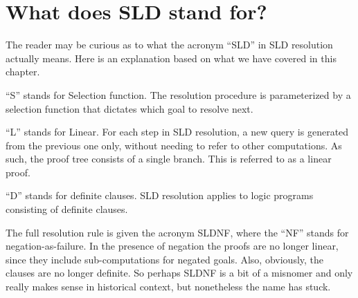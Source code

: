 \section{What does SLD stand for?}
\label{sec:sld}

The reader may be curious as to what the acronym ``SLD''
in SLD resolution actually means.
Here is an explanation
based on what we have covered in this chapter.

``S'' stands for Selection function.
The resolution procedure is parameterized by
a selection function that dictates which goal to resolve next.

``L'' stands for Linear.
For each step in SLD resolution,
a new query is generated from the previous one only,
without needing to refer to other computations.
As such,
the proof tree consists of a single branch.
This is referred to as a linear proof.

``D'' stands for definite clauses.
SLD resolution applies to logic programs
consisting of definite clauses.

The full resolution rule is given the acronym SLDNF,
where the ``NF'' stands for negation-as-failure.
In the presence of negation the proofs are no longer linear,
since they include sub-computations for negated goals.
Also, obviously, the clauses are no longer definite.
So perhaps SLDNF is a bit of a misnomer
and only really makes sense in historical context,
but nonetheless the name has stuck.

